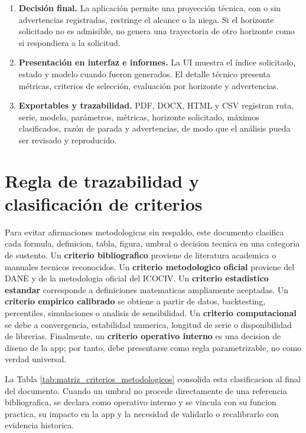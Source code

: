 ﻿\documentclass[12pt,letterpaper]{article}
\newcommand{\ICOCIV}{ICOCIV}
\begin{document}
\begin{enumerate}[leftmargin=*,label=\textbf{Paso \arabic*.}]
    \item \textbf{Decisión final.} La aplicación permite una proyección técnica, con o sin advertencias registradas, restringe el alcance o la niega. Si el horizonte solicitado no es admisible, no genera una trayectoria de otro horizonte como si respondiera a la solicitud.

    \item \textbf{Presentación en interfaz e informes.} La UI muestra el índice solicitado, estado y modelo cuando fueron generados. El detalle técnico presenta métricas, criterios de selección, evaluación por horizonte y advertencias.

    \item \textbf{Exportables y trazabilidad.} PDF, DOCX, HTML y CSV registran ruta, serie, modelo, parámetros, métricas, horizonte solicitado, máximos clasificados, razón de parada y advertencias, de modo que el análisis pueda ser revisado y reproducido.
\end{enumerate}

\section{Regla de trazabilidad y clasificación de criterios}

Para evitar afirmaciones metodologicas sin respaldo, este documento clasifica cada formula, definicion, tabla, figura, umbral o decision tecnica en una categoria de sustento. Un \textbf{criterio bibliografico} proviene de literatura academica o manuales tecnicos reconocidos. Un \textbf{criterio metodologico oficial} proviene del DANE y de la metodologia oficial del \ICOCIV{}. Un \textbf{criterio estadistico estandar} corresponde a definiciones matematicas ampliamente aceptadas. Un \textbf{criterio empirico calibrado} se obtiene a partir de datos, backtesting, percentiles, simulaciones o analisis de sensibilidad. Un \textbf{criterio computacional} se debe a convergencia, estabilidad numerica, longitud de serie o disponibilidad de librerias. Finalmente, un \textbf{criterio operativo interno} es una decision de diseno de la app; por tanto, debe presentarse como regla parametrizable, no como verdad universal.

La Tabla \ref{tab:matriz_criterios_metodologicos} consolida esta clasificacion al final del documento. Cuando un umbral no procede directamente de una referencia bibliografica, se declara como operativo interno y se vincula con su funcion practica, su impacto en la app y la necesidad de validarlo o recalibrarlo con evidencia historica.
\end{document}
